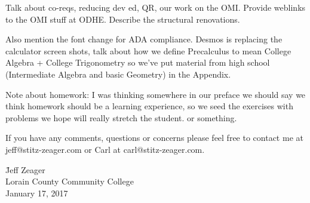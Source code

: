 \noindent 


Talk about co-reqs, reducing dev ed, QR, our work on the OMI.  Provide weblinks to the OMI stuff at ODHE.  Describe the structural renovations.  

Also mention the font change for ADA compliance.  Desmos is replacing the calculator screen shots,  talk about how we define Precalculus to mean College Algebra + College Trigonometry so we've put material from high school (Intermediate Algebra and basic Geometry) in the Appendix.

\noindent  Note about homework:  I was thinking somewhere in our preface we should say we think homework should be a learning experience, so we seed the exercises with problems we hope will really stretch the student. or something.

  If you have any comments, questions or concerns please feel free to contact me at jeff@stitz-zeager.com or Carl at carl@stitz-zeager.com.

\vspace{.5in}

\begin{tabbing}

\hspace{4in}   \= Jeff Zeager \\
               \> Lorain County Community College \\
               \> January 17, 2017
               
\end{tabbing}